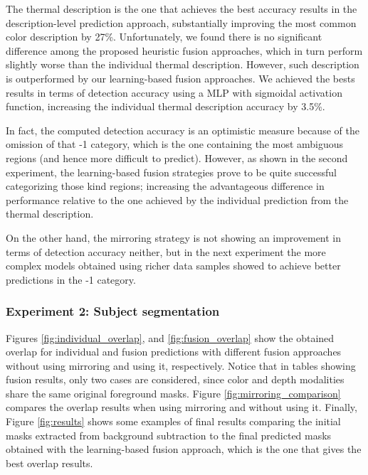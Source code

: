 \documentclass[10pt,twocolumn,letterpaper]{article}
\begin{document}
The thermal description is the one that achieves the best accuracy results in the description-level prediction approach, substantially improving the most common color description by 27\%. Unfortunately, we found there is no significant difference among the proposed heuristic fusion approaches, which in turn perform slightly worse than the individual thermal description. However, such description is outperformed by our learning-based fusion approaches. We achieved the bests results in terms of detection accuracy using a MLP with sigmoidal activation function, increasing the individual thermal description accuracy by 3.5\%.

In fact, the computed detection accuracy is an optimistic measure because of the omission of that -1 category, which is the one containing the most ambiguous regions (and hence more difficult to predict). However, as shown in the second experiment, the learning-based fusion strategies prove to be quite successful categorizing those kind regions; increasing the advantageous difference in performance relative to the one achieved by the individual prediction from the thermal description. 

On the other hand, the mirroring strategy is not showing an improvement in terms of detection accuracy neither, but in the next experiment the more complex models obtained using richer data samples showed to achieve better predictions in the -1 category.

\subsubsection{Experiment 2: Subject segmentation }

Figures \ref{fig:individual_overlap}, and \ref{fig:fusion_overlap} show the obtained overlap for individual and fusion predictions with different fusion approaches without using mirroring and using it, respectively. Notice that in tables showing fusion results, only two cases are considered, since color and depth modalities share the same original foreground masks. Figure \ref{fig:mirroring_comparison} compares the overlap results when using mirroring and without using it. Finally, Figure \ref{fig:results} shows some examples of final results comparing the initial masks extracted from background subtraction to the final predicted masks obtained with the learning-based fusion approach, which is the one that gives the best overlap results.
\end{document}
